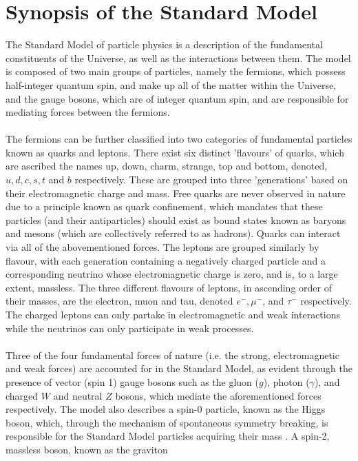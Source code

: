 \section{Synopsis of the Standard Model}
The Standard Model of particle physics is a description of the fundamental constituents of the Universe, as well as the interactions between them.
The model is composed of two main groups of particles, namely the fermions, which possess half-integer quantum spin, and make up all of the 
matter within the Universe, and the gauge bosons, which are of integer quantum spin, and are responsible for mediating forces between the fermions.\\
\\
The fermions can be further classified into two categories of fundamental particles known as quarks and leptons. There exist six distinct 'flavours' of quarks, which are
ascribed the names up, down, charm, strange, top and bottom, denoted, $u, d, c, s, t$ and $b$ respectively. These are grouped into three 'generations' based on their electromagnetic charge
and mass. Free quarks are never observed in nature due to a principle known as quark confinement, which mandates that these particles (and their antiparticles) should exist as bound states known as baryons and mesons
(which are collectively referred to as hadrons). Quarks can interact via all of the abovementioned forces. The leptons are grouped similarly by flavour, with each generation containing a negatively charged particle and a corresponding neutrino
whose electromagnetic charge is zero, and is, to a large extent, massless. The three different flavours of leptons, in ascending order of their masses, are the electron, muon and tau, denoted $e^{-}, \mu^{-}$, and $\tau^{-}$ respectively. The charged leptons
can only partake in electromagnetic and weak interactions while the neutrinos can only participate in weak processes.\\
\\
Three of the four fundamental forces of nature (i.e. the strong, electromagnetic and weak forces) are accounted for in the Standard Model, as evident through the presence of vector (spin 1) gauge bosons such as the gluon ($g$), photon ($\gamma$), and charged $W$ and neutral $Z$ bosons, 
which mediate the aforementioned forces respectively. The model also describes a spin-0 particle, known as the Higgs boson, which, through the mechanism of spontaneous symmetry breaking, is responsible for the Standard Model particles acquiring their mass \cite{ATLAS:2012znl}. A spin-2, massless boson, known as the graviton
